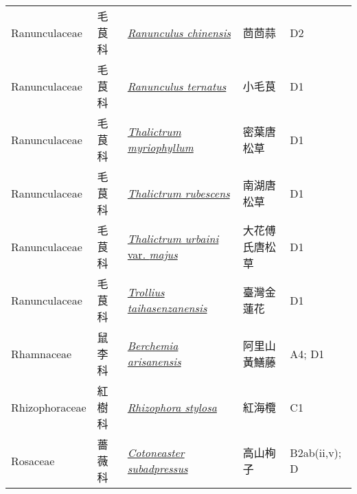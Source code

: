 {\begin{longtable}{L{2.5cm}L{2cm}L{5cm}L{2.5cm}L{3cm}}
    Ranunculaceae & 毛茛科 & \href{http://www.theplantlist.org/tpl1.1/search?q=Ranunculus+chinensis}{\textit{Ranunculus chinensis} } & 茴茴蒜 & D2    \\
    Ranunculaceae & 毛茛科 & \href{http://www.theplantlist.org/tpl1.1/search?q=Ranunculus+ternatus}{\textit{Ranunculus ternatus} } & 小毛茛 & D1    \\
    Ranunculaceae & 毛茛科 & \href{http://www.theplantlist.org/tpl1.1/search?q=Thalictrum+myriophyllum}{\textit{Thalictrum myriophyllum} } & 密葉唐松草 & D1    \\
    Ranunculaceae & 毛茛科 & \href{http://www.theplantlist.org/tpl1.1/search?q=Thalictrum+rubescens}{\textit{Thalictrum rubescens} } & 南湖唐松草 & D1    \\
    Ranunculaceae & 毛茛科 & \href{http://www.theplantlist.org/tpl1.1/search?q=Thalictrum+urbaini+var.+majus}{\textit{Thalictrum urbaini} var. \textit{majus} } & 大花傅氏唐松草 & D1    \\
    Ranunculaceae & 毛茛科 & \href{http://www.theplantlist.org/tpl1.1/search?q=Trollius+taihasenzanensis}{\textit{Trollius taihasenzanensis} } & 臺灣金蓮花 & D1    \\
    Rhamnaceae & 鼠李科 & \href{http://www.theplantlist.org/tpl1.1/search?q=Berchemia+arisanensis}{\textit{Berchemia arisanensis} } & 阿里山黃鱔藤 & A4; D1    \\
    Rhizophoraceae & 紅樹科 & \href{http://www.theplantlist.org/tpl1.1/search?q=Rhizophora+stylosa}{\textit{Rhizophora stylosa} } & 紅海欖 & C1    \\
    Rosaceae & 薔薇科 & \href{http://www.theplantlist.org/tpl1.1/search?q=Cotoneaster+subadpressus}{\textit{Cotoneaster subadpressus} } & 高山栒子 & B2ab(ii,v); D    \\

\end{longtable}}
